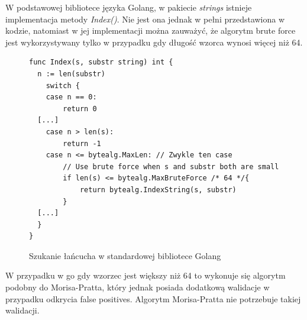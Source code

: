 W podstawowej bibliotece języka Golang, w pakiecie \textit{strings} istnieje 
implementacja metody \textit{Index()}. Nie jest ona jednak w pełni przedstawiona
w kodzie, natomiast w jej implementacji można zauważyć, że algorytm brute force
jest wykorzystywany tylko w przypadku gdy długość wzorca wynosi więcej niż 64.

\begin{figure}[h]
  \centering
  \begin{lstlisting}
func Index(s, substr string) int {
  n := len(substr)
	switch {
	case n == 0:
		return 0
  [...]
	case n > len(s):
		return -1
	case n <= bytealg.MaxLen: // Zwykle ten case
		// Use brute force when s and substr both are small
		if len(s) <= bytealg.MaxBruteForce /* 64 */{
			return bytealg.IndexString(s, substr)
		}
  [...]
  }
}
  \end{lstlisting}
  \caption{ Szukanie łańcucha w standardowej bibliotece Golang }
  \label{fig:code:preprocessMorisPratt}
\end{figure}

W przypadku w go gdy wzorzec jest większy niż 64 to wykonuje się algorytm 
podobny do Morisa-Pratta, który jednak posiada dodatkową walidacje w przypadku
odkrycia false positives. Algorytm Morisa-Pratta nie potrzebuje takiej walidacji.

